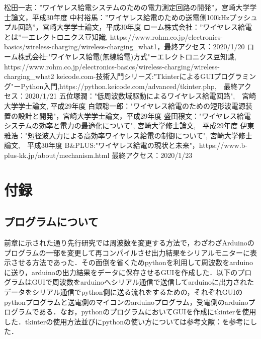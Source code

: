 \documentclass[12pt]{jarticle}
\begin{document}
\begin{thebibliography}{50}
	松田一志：”ワイヤレス給電システムのための電力測定回路の開発”，宮崎大学学士論文，平成30年度
	中村裕馬：”ワイヤレス給電のための送電側100kHzプッシュプル回路”，宮崎大学学士論文，平成30年度
	ローム株式会社：”ワイヤレス給電とは”ーエレクトロニクス豆知識, https://www.rohm.co.jp/electronics-basics/wireless-charging/wireless-charging\_what1，最終アクセス：2020/1/20
	ローム株式会社:"ワイヤレス給電(無線給電)方式"ーエレクトロニクス豆知識, https://www.rohm.co.jp/electronics-basics/wireless-charging/wireless-charging\_what2
	keicode.com-技術入門シリーズ:"TkinterによるGUIプログラミング"ーPython入門,https://python.keicode.com/advanced/tkinter.php,　最終アクセス：2020/1/21
	五位塚潤："低周波数域駆動によるワイヤレス給電回路",　宮崎大学学士論文, 平成29年度
	白銀聡一郎："ワイヤレス給電のための短形波電源装置の設計と開発"，宮崎大学学士論文，平成29年度
	盛田穣文："ワイヤレス給電システムの効率と電力の最適化について", 宮崎大学修士論文,　平成29年度
	伊東雅浩："短径波入力による高効率ワイヤレス給電の制御について", 宮崎大学修士論文,　平成30年度
	B\&PLUS:"ワイヤレス給電の現状と未来"，https://www.b-plus-kk.jp/about/mechanism.html 最終アクセス：2020/1/23
\end{thebibliography}
\clearpage
\section{付録}
\subsection{プログラムについて}
前章に示された通り先行研究では周波数を変更する方法で，わざわざArduinoのプログラムの一部を変更して再コンパイルさせ出力結果をシリアルモニターに表示させる方法であった．その面倒を省くためpythonを利用して周波数をarduinoに送り，arduinoの出力結果をデータに保存させるGUIを作成した．以下のプログラムはGUIで周波数をarduinoへシリアル通信で送信してarduinoに出力されたデータをシリアル通信でpython側に送る流れをするための，それぞれGUIのpythonプログラムと送電側のマイコンのarduinoプログラム，受電側のarduinoプログラムである．なお，pythonのプログラムにおいてGUIを作成にtkinterを使用した．tkinterの使用方法並びにpythonの使い方については参考文献：\cite{tkinter}を参考にした．
\end{document}

